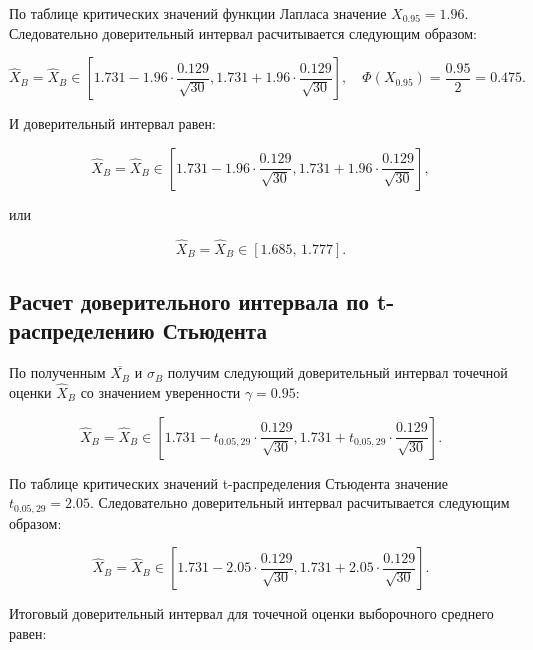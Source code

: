 \documentclass[
]{article}
\begin{document}
По таблице критических значений функции Лапласа значение
\(X_{0.95} = 1.96\). Следовательно доверительный интервал расчитывается
следующим образом:

\[
\hat{X}_{B} = \hat{X}_{B} \in \left[ 1.731 - 1.96 \cdot \frac{0.129}{\sqrt{30}}, 1.731 + 1.96 \cdot \frac{0.129}{\sqrt{30}} \right], \quad \Phi(X_{0.95}) = \frac{0.95}{2} = 0.475.
\]

И доверительный интервал равен:

\[
\hat{X}_{B} = \hat{X}_{B} \in \left[ 1.731 - 1.96 \cdot \frac{0.129}{\sqrt{30}}, 1.731 + 1.96 \cdot \frac{0.129}{\sqrt{30}} \right],
\]

или

\[
\hat{X}_{B} = \hat{X}_{B} \in \left[ 1.685,\, 1.777 \right].
\]

\hypertarget{ux440ux430ux441ux447ux435ux442-ux434ux43eux432ux435ux440ux438ux442ux435ux43bux44cux43dux43eux433ux43e-ux438ux43dux442ux435ux440ux432ux430ux43bux430-ux43fux43e-t-ux440ux430ux441ux43fux440ux435ux434ux435ux43bux435ux43dux438ux44e-ux441ux442ux44cux44eux434ux435ux43dux442ux430}{%
\subsection{\texorpdfstring{\textbf{Расчет доверительного интервала по
t-распределению
Стьюдента}}{Расчет доверительного интервала по t-распределению Стьюдента}}\label{ux440ux430ux441ux447ux435ux442-ux434ux43eux432ux435ux440ux438ux442ux435ux43bux44cux43dux43eux433ux43e-ux438ux43dux442ux435ux440ux432ux430ux43bux430-ux43fux43e-t-ux440ux430ux441ux43fux440ux435ux434ux435ux43bux435ux43dux438ux44e-ux441ux442ux44cux44eux434ux435ux43dux442ux430}}

По полученным \(\overline{X_{B}}\) и \(\sigma_{B}\) получим следующий
доверительный интервал точечной оценки \(\hat{X}_{B}\) со значением
уверенности \(\gamma = 0.95\):

\[
\hat{X}_{B} = \hat{X}_{B} \in \left[ 1.731 - t_{0.05, 29} \cdot \frac{0.129}{\sqrt{30}}, 1.731 + t_{0.05, 29} \cdot \frac{0.129}{\sqrt{30}} \right].
\]

По таблице критических значений t-распределения Стьюдента значение
\(t_{0.05, 29} = 2.05\). Следовательно доверительный интервал
расчитывается следующим образом:

\[
\hat{X}_{B} = \hat{X}_{B} \in \left[ 1.731 - 2.05 \cdot \frac{0.129}{\sqrt{30}}, 1.731 + 2.05 \cdot \frac{0.129}{\sqrt{30}} \right].
\]

Итоговый доверительный интервал для точечной оценки выборочного среднего
равен:
\end{document}
